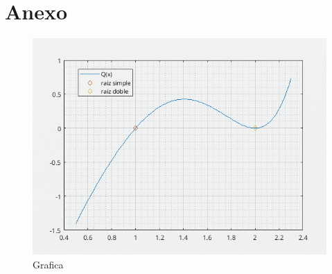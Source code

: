 \documentclass[11pt]{article}
\begin{document}
\section{Anexo}
\begin{figure}[H]
\centering
\includegraphics[width=.8\linewidth]{./Racional.png}
\caption{\label{fig:org83d02e0}
Grafica}
\end{figure}
\end{document}
